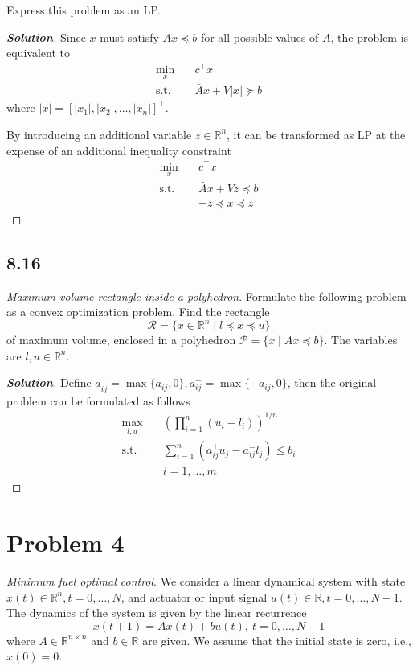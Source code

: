 \documentclass[11pt]{article}
\newenvironment{solution}
  {\renewcommand\qedsymbol{$\square$}\begin{proof}[\textbf{Solution}]}
  {\end{proof}}
\newcommand{\RR}{\mathbb{R}}
\newcommand{\T}{^\top}
\begin{document}
Express this problem as an LP.

\begin{solution}
  Since $x$ must satisfy $Ax\preceq b$ for all possible values of $A$, the problem is equivalent to
  \begin{align*}
    \min_x \quad &c\T x\\
    \text{s.t.}\quad & \bar A x + V|x| \succeq b
  \end{align*}
  where $|x| = [|x_1|, |x_2|, \dots, |x_n|]\T$.

  By introducing an additional variable $z\in\RR^n$, it can be transformed as LP at the expense of an additional inequality constraint
  \begin{align*}
    \min_x \quad &c\T x\\
    \text{s.t.}\quad & \bar A x + Vz \preceq b\\
    &-z \preceq x \preceq z
  \end{align*}
\end{solution}


\subsection*{8.16}
\textit{Maximum volume rectangle inside a polyhedron}. Formulate the following problem as a convex optimization problem. Find the rectangle
\[
\mathcal{R} = \{x\in\RR^n \mid l\preceq x \preceq u\}
\]
of maximum volume, enclosed in a polyhedron $\mathcal{P} = \{x \mid Ax \preceq b\}$. The variables are $l, u \in\RR^n$.

\begin{solution}
  Define $a^+_{ij} = \max\{a_{ij}, 0\}, a^{-}_{ij}=\max\{-a_{ij}, 0\}$, then the original problem can be formulated as follows
  \begin{align*}
    \max_{l, u}\quad &(\prod_{i=1}^{n} (u_i - l_i))^{1/n}\\
    \text{s.t.}\quad & \sum_{i=1}^{n}(a^+_{ij}u_j - a^{-}_{ij}l_j) \leq b_i\\
    &i=1,\dots, m
  \end{align*}
\end{solution}

\clearpage
\section*{Problem 4}
\textit{Minimum fuel optimal control}. We consider a linear dynamical system with state $x(t)\in \RR^n, t=0, \dots, N$, and actuator or input signal $u(t)\in\RR, t=0, \dots, N-1$. The dynamics of the system is given by the linear recurrence
\[
x(t+1) = Ax(t) + bu(t),\ t=0, \dots, N-1
\]
where $A\in\RR^{n\times n}$ and $b\in \RR$ are given. We assume that the initial state is zero, i.e., $x(0) = 0$.
\end{document}

